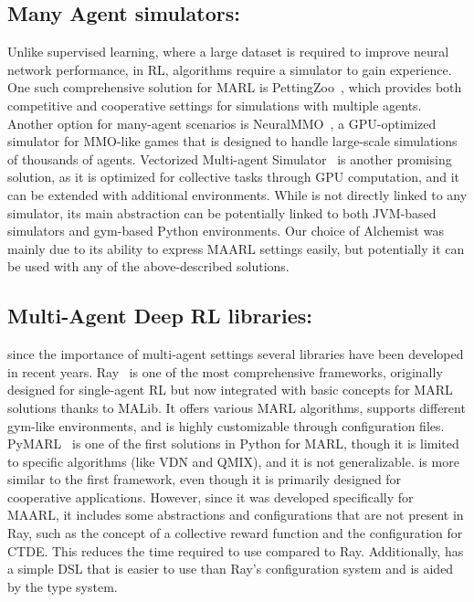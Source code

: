 \subsection{Many Agent simulators:}   
Unlike supervised learning, 
 where a large dataset is required to improve neural network performance, 
 in RL, algorithms require a simulator to gain experience. 
One such comprehensive solution for MARL is PettingZoo~\cite{NEURIPS2021_7ed2d345}, 
 which provides both competitive and cooperative settings 
 for simulations with multiple agents. 
%
Another option for many-agent scenarios is NeuralMMO~\cite{https://doi.org/10.48550/arxiv.1903.00784}, 
 a GPU-optimized simulator for MMO-like games 
 that is designed to handle large-scale simulations of thousands of agents.
% 
Vectorized Multi-agent Simulator~\cite{bettini2022vmas} is another promising solution, 
 as it is optimized for collective tasks through GPU computation, 
 and it can be extended with additional environments.
%
While \scarlib is not directly linked to any simulator, 
 its main abstraction can be potentially linked 
 to both JVM-based simulators and gym-based Python environments. 
 Our choice of Alchemist was mainly due to its ability to express \ac{MAARL} settings easily, but potentially it can be used with any of the above-described solutions.
\subsection{Multi-Agent Deep RL libraries:}
since the importance of multi-agent settings several libraries have been developed in recent years. 
Ray~\cite{ray} is one of the most comprehensive frameworks, 
 originally designed for single-agent RL but 
 now integrated with basic concepts for MARL solutions thanks to MALib. 
It offers various MARL algorithms,
 supports different gym-like environments, 
 and is highly customizable through configuration files. 
%
PyMARL~\cite{samvelyan19smac} is one of the first solutions in Python for MARL, 
 though it is limited to specific algorithms (like VDN and QMIX), 
 and it is not generalizable. 
%
\scarlib{} is more similar to the first framework, 
 even though it is primarily designed for cooperative applications. 
%
However, since it was developed specifically for \ac{MAARL}, 
 it includes some abstractions and configurations that are not present in Ray, 
 such as the concept of a collective reward function and the configuration for CTDE. 
%
This reduces the time required to use \scarlib{} compared to Ray. 
 Additionally, \scarlib{} has a simple DSL that is easier to use than Ray's configuration system and is aided by the type system.

